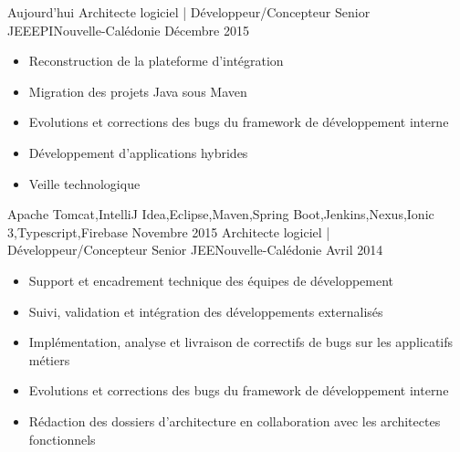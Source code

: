 %
%
%

\begin{experiences}
  \experience
    {Aujourd'hui}   {Architecte logiciel | Développeur/Concepteur Senior JEE}{EPI}{Nouvelle-Calédonie}
    {Décembre 2015} {
                      \begin{itemize}
                        \item Reconstruction de la plateforme d'intégration                        
                        \item Migration des projets Java sous Maven                    
                        \item Evolutions et corrections des bugs du framework de développement interne  
                        \item Développement d'applications hybrides              
                        \item Veille technologique                                                                    
                      \end{itemize}
                    }
                    {Apache Tomcat,IntelliJ Idea,Eclipse,Maven,Spring Boot,Jenkins,Nexus,Ionic 3,Typescript,Firebase}
  \emptySeparator
  \experience
    {Novembre 2015} {Architecte logiciel | Développeur/Concepteur Senior JEE}{}{Nouvelle-Calédonie}
    {Avril 2014}    {
                      \begin{itemize}
                        \item Support et encadrement technique des équipes de développement                           
                        \item Suivi, validation et intégration des développements externalisés                        
                        \item Implémentation, analyse et livraison de correctifs de bugs sur les applicatifs métiers  
                        \item Evolutions et corrections des bugs du framework de développement interne                
                        \item Rédaction des dossiers d'architecture en collaboration avec les architectes fonctionnels

\end{itemize}}
\end{experiences}
